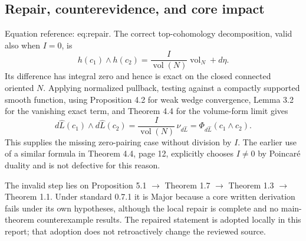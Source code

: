 \documentclass[10pt]{article}
\begin{document}
\subsection*{Repair, counterevidence, and core impact}
Equation reference: eq:repair. The correct top-cohomology decomposition, valid also when \(I=0\), is \[
 h(c_1)\wedge h(c_2)=\frac{I}{\operatorname{vol}(N)}\operatorname{vol}_N+d\eta .\] Its difference has integral zero and hence is exact on the closed connected oriented \(N\). Applying normalized pullback, testing against a compactly supported smooth function, using Proposition 4.2 for weak wedge convergence, Lemma 3.2 for the vanishing exact term, and Theorem 4.4 for the volume-form limit gives \[d\widehat L(c_1)\wedge d\widehat L(c_2)
  =\frac{I}{\operatorname{vol}(N)}\,\nu_{d\widehat L}
  =\Phi_{d\widehat L}(c_1\wedge c_2).\] This supplies the missing zero-pairing case without division by \(I\). The earlier use of a similar formula in Theorem 4.4, page 12, explicitly chooses \(I\ne0\) by Poincaré duality and is not defective for this reason.\par
The invalid step lies on Proposition 5.1 \(\to\) Theorem 1.7 \(\to\) Theorem 1.3 \(\to\) Theorem 1.1. Under standard 0.7.1 it is Major because a core written derivation fails under its own hypotheses, although the local repair is complete and no main-theorem counterexample results. The repaired statement is adopted locally in this report; that adoption does not retroactively change the reviewed source.\par
\end{document}
